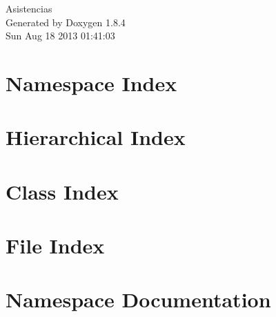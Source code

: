\documentclass[twoside]{book}
\newcommand{\clearemptydoublepage}{%
  \newpage{\pagestyle{empty}\cleardoublepage}%
}
\begin{document}
\hypersetup{pageanchor=false}
\begin{titlepage}
\vspace*{7cm}
\begin{center}%
{\Large Asistencias }\\
\vspace*{1cm}
{\large Generated by Doxygen 1.8.4}\\
\vspace*{0.5cm}
{\small Sun Aug 18 2013 01:41:03}\\
\end{center}
\end{titlepage}
\clearemptydoublepage
\tableofcontents
\clearemptydoublepage
{}
\hypersetup{pageanchor=true}

\chapter{Namespace Index}

\chapter{Hierarchical Index}

\chapter{Class Index}

\chapter{File Index}

\chapter{Namespace Documentation}









\end{document}
